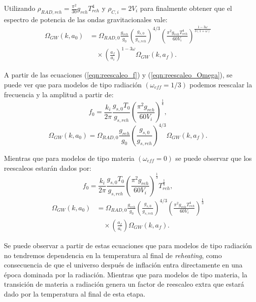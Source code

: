 Utilizando $\rho_{RAD,reh} = \frac{\pi^2}{30} g_{reh} T^4_{reh}$ y $\rho_{C,i} = 2 V_i$ para finalmente obtener que el espectro de potencia de las ondas gravitacionales vale:
\begin{equation}\label{eqn:reescaleo_Omega}
    \begin{split}
        \Omega_{GW} (k, a_0) &= \Omega_{RAD,0} \frac{g_{reh}}{g_{0}} \left( \frac{g_{s,0}}{g_{s,reh}} \right)^{4/3} \left( \frac{\pi^2 g_{reh} T_{reh}^4}{60 V_i} \right)^{\frac{1 - 3 \omega}{3 (1 + \omega)}} \\
        &\quad \times \left( \frac{a_{f}}{a_{i}} \right)^{1 - 3 \omega} \Omega_{GW} \left( k, a_f \right).
    \end{split}
\end{equation}

A partir de las ecuaciones (\ref{eqn:reescaleo_f}) y (\ref{eqn:reescaleo_Omega}), se puede ver que para modelos de tipo radiación $(\omega_{eff} = 1/3)$ podemos reescalar la frecuencia y la amplitud a partir de:
\begin{equation}
    f_0 = \frac{k_i}{2 \pi} \frac{g_{s,0} T_0}{g_{s,reh}} \left( \frac{\pi^2 g_{reh}}{60 V_{i}} \right)^{\frac{1}{4}},
\end{equation}
\begin{equation}
    \Omega_{GW} (k, a_0) = \Omega_{RAD,0} \frac{g_{reh}}{g_{0}} \left( \frac{g_{s,0}}{g_{s,reh}} \right)^{4/3} \Omega_{GW} \left( k, a_f \right).
\end{equation}

Mientras que para modelos de tipo materia $(\omega_{eff} = 0)$ se puede observar que los reescaleos estarán dados por:
\begin{equation}
    f_0 = \frac{k_i}{2 \pi} \frac{g_{s,0} T_0}{g_{s,reh}} \left( \frac{\pi^2 g_{reh}}{60 V_{i}} \right)^{\frac{1}{3}} T^{\frac{1}{3}}_{reh},
\end{equation}
\begin{equation}
    \begin{split}
        \Omega_{GW} (k, a_0) &= \Omega_{RAD,0} \frac{g_{reh}}{g_{0}} \left( \frac{g_{s,0}}{g_{s,reh}} \right)^{4/3} \left( \frac{\pi^2 g_{reh} T_{reh}^4}{60 V_i} \right)^{\frac{1}{3}} \\
        &\quad \times \left( \frac{a_{f}}{a_{i}} \right) \Omega_{GW} \left( k, a_f \right).
    \end{split}
\end{equation}

Se puede observar a partir de estas ecuaciones que para modelos de tipo radiación no tendremos dependencia en la temperatura al final de \textit{reheating}, como consecuencia de que el universo después de inflación entra directamente en una época dominada por la radiación. Mientras que para modelos de tipo materia, la transición de materia a radiación genera un factor de reescaleo extra que estará dado por la temperatura al final de esta etapa.